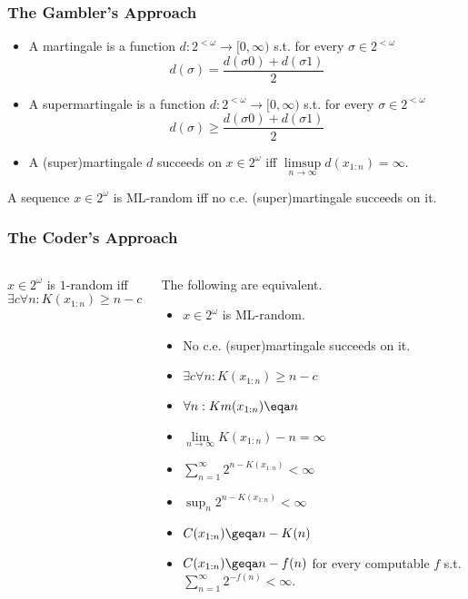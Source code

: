 \documentclass[UTF8,11pt,colorlinks,compress,openany]{beamer}%
\begin{document}
\begin{frame}\frametitle{The Gambler's Approach}
\begin{itemize}
	\item A martingale is a function $d: 2^{<\omega}\to[0,\infty)$ s.t. for every $\sigma\in 2^{<\omega}$
	\[d(\sigma)=\frac{d(\sigma0)+d(\sigma1)}{2}\]
	\item A supermartingale is a function $d: 2^{<\omega}\to[0,\infty)$ s.t. for every $\sigma\in 2^{<\omega}$
	\[d(\sigma)\geq\frac{d(\sigma0)+d(\sigma1)}{2}\]
	\item A (super)martingale $d$ succeeds on $x\in 2^\omega$ iff $\limsup\limits_{n\to\infty}d(x_{1:n})=\infty$.
\end{itemize}
\begin{theorem}
A sequence $x\in 2^\omega$ is ML-random iff no c.e. (super)martingale succeeds on it.
\end{theorem}
\end{frame}

\begin{frame}\frametitle{The Coder's Approach}
\setlength\abovedisplayskip{0pt}
\setlength\belowdisplayskip{0pt}
\begin{columns}
\begin{definition}[$1$-Randomness]
$x\in 2^\omega$ is $1$-random iff
\[\exists c\forall n: K(x_{1:n})\geq n-c\]
\end{definition}
\begin{theorem}
The following are equivalent.
\begin{itemize}
	\item $x\in 2^\omega$ is ML-random.
	\item No c.e. (super)martingale succeeds on it.
	\item $\exists c\forall n: K(x_{1:n})\geq n-c$
	\item $\forall n: Km(x_{1:n})\eqa n$
	\item $\lim\limits_{n\to\infty}K(x_{1:n})-n=\infty$
	\item $\sum\limits_{n=1}^\infty 2^{n-K(x_{1:n})}<\infty$
	\item $\sup_n 2^{n-K(x_{1:n})}<\infty$
	\item $C(x_{1:n})\geqa n-K(n)$
	\item $C(x_{1:n})\geqa n-f(n)$ for every computable $f$ s.t. $\sum\limits_{n=1}^\infty 2^{-f(n)}<\infty$.
\end{itemize}
\end{theorem}
\end{columns}
\end{frame}
\end{document}
